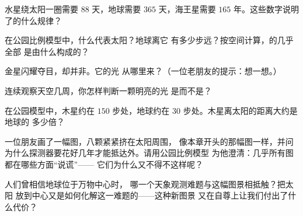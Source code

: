 \begin{exercise}[$\star$]\label{exo:g4:solar-system:5}
水星绕太阳一圈需要 $88$ 天，地球需要 $365$ 天，海王星需要
$165$ 年。这些数字说明了的什么规律？
\end{exercise}

\begin{exercise}[$\star$]\label{exo:g4:solar-system:6}
在公园比例模型中，什么代表太阳？地球离它
有多少步远？按空间计算，的几乎全部
是由什么构成的？
\end{exercise}

\begin{exercise}[$\star$]\label{exo:g4:solar-system:7}
金星闪耀夺目，却并非。它的光
从哪里来？（一位老朋友的提示：想一想。）
\end{exercise}

\begin{exercise}[$\star$]\label{exo:g4:solar-system:8}
连续观察天空几周，你怎样判断一颗明亮的光
是而不是？
\end{exercise}

\begin{exercise}[$\star$]\label{exo:g4:solar-system:9}
在公园模型中，木星约在 $150$ 步处，地球约在
$30$ 步处。木星离太阳的距离大约是地球的
多少倍？
\end{exercise}

\begin{exercise}[$\star\star$]\label{exo:g4:solar-system:10}
一位朋友画了一幅图，八颗紧紧挤在太阳周围，
像本章开头的那幅图一样，并问
为什么探测器要花好几年才能抵达外。请用公园比例模型
为他澄清：几乎所有图都在哪些方面“说谎”——
它们为什么又不得不这样呢？
\end{exercise}

\begin{exercise}[$\star\star$]\label{exo:g4:solar-system:11}
人们曾相信地球位于万物中心时，
哪一个天象观测难题与这幅图景相抵触？把太阳
放到中心又是如何化解这一难题的——这种新图景
又在自尊上让我们付出了什么代价？
\end{exercise}
